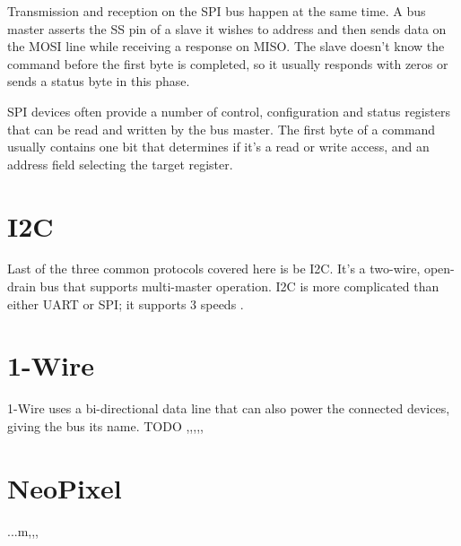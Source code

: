 Transmission and reception on the SPI bus happen at the same time. A bus master asserts the SS pin of a slave it wishes to address and then sends data on the MOSI line while receiving a response on MISO. The slave doesn't know the command before the first byte is completed, so it usually responds with zeros or sends a status byte in this phase.


SPI devices often provide a number of control, configuration and status registers that can be read and written by the bus master. The first byte of a command usually contains one bit that determines if it's a read or write access, and an address field selecting the target register.


\section{I2C}

Last of the three common protocols covered here is be I2C. It's a two-wire, open-drain bus that supports multi-master operation. I2C is more complicated than either UART or SPI; it supports 3 speeds .


\section{1-Wire}

1-Wire uses a bi-directional data line that can also power the connected devices, giving the bus its name. TODO ,,,,,

\section{NeoPixel}

...m,,,
